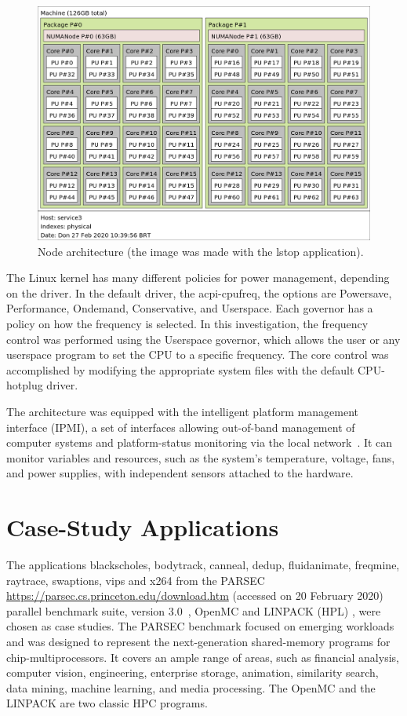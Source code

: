 \begin{figure}[H]
	\centering
	\includegraphics[width=\columnwidth]{models/figures/architecture.png}
	\caption{Node architecture (the image was made with the lstop application).}
	\label{fig:architecture}
\end{figure}

The Linux kernel has many different policies for power management, depending on the driver. In the default driver, the acpi-cpufreq, the options are Powersave, Performance, Ondemand, Conservative, and Userspace. Each governor has a policy on how the frequency is selected. In this investigation, the frequency control was performed using the Userspace governor, which allows the user or any userspace program to set the CPU to a specific frequency. The core control was accomplished by modifying the appropriate system files with the default CPU-hotplug driver.

The architecture was equipped with the intelligent platform management interface (IPMI), a set of interfaces allowing out-of-band management of computer systems and platform-status monitoring via the local network~\cite{Schwenkler2006IntelligentInterface}. It can monitor variables and resources, such as the system's temperature, voltage, fans, and power supplies, with independent sensors attached to the hardware.

\section{Case-Study Applications} \label{sec:casestudyapplication}
The applications blackscholes, bodytrack, canneal, dedup, fluidanimate, freqmine, raytrace, swaptions, vips and x264 from the PARSEC \url{https://parsec.cs.princeton.edu/download.htm} (accessed on 20 February  2020) parallel benchmark suite, version 3.0~\cite{Bienia2008TheSuite}, OpenMC \cite{Romano2015OpenMC:Development} and LINPACK (HPL) \cite{Dongarra1988TheExplanation}, were chosen as case studies. The PARSEC benchmark focused on emerging workloads and was designed to represent the next-generation shared-memory programs for chip-multiprocessors. It covers an ample range of areas, such as financial analysis, computer vision, engineering, enterprise storage, animation, similarity search, data mining, machine learning, and media processing. The OpenMC and the LINPACK are two classic HPC programs.

